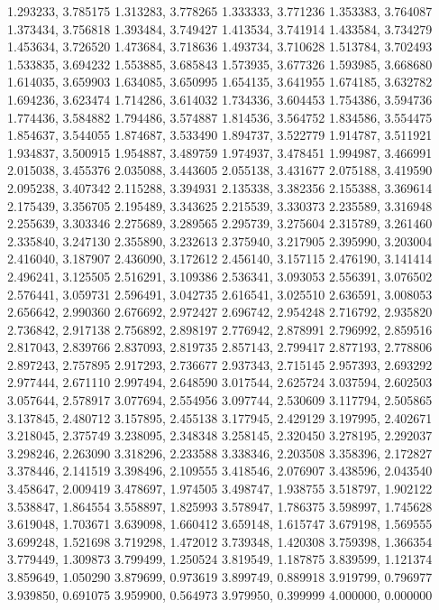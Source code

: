 1.293233, 3.785175
1.313283, 3.778265
1.333333, 3.771236
1.353383, 3.764087
1.373434, 3.756818
1.393484, 3.749427
1.413534, 3.741914
1.433584, 3.734279
1.453634, 3.726520
1.473684, 3.718636
1.493734, 3.710628
1.513784, 3.702493
1.533835, 3.694232
1.553885, 3.685843
1.573935, 3.677326
1.593985, 3.668680
1.614035, 3.659903
1.634085, 3.650995
1.654135, 3.641955
1.674185, 3.632782
1.694236, 3.623474
1.714286, 3.614032
1.734336, 3.604453
1.754386, 3.594736
1.774436, 3.584882
1.794486, 3.574887
1.814536, 3.564752
1.834586, 3.554475
1.854637, 3.544055
1.874687, 3.533490
1.894737, 3.522779
1.914787, 3.511921
1.934837, 3.500915
1.954887, 3.489759
1.974937, 3.478451
1.994987, 3.466991
2.015038, 3.455376
2.035088, 3.443605
2.055138, 3.431677
2.075188, 3.419590
2.095238, 3.407342
2.115288, 3.394931
2.135338, 3.382356
2.155388, 3.369614
2.175439, 3.356705
2.195489, 3.343625
2.215539, 3.330373
2.235589, 3.316948
2.255639, 3.303346
2.275689, 3.289565
2.295739, 3.275604
2.315789, 3.261460
2.335840, 3.247130
2.355890, 3.232613
2.375940, 3.217905
2.395990, 3.203004
2.416040, 3.187907
2.436090, 3.172612
2.456140, 3.157115
2.476190, 3.141414
2.496241, 3.125505
2.516291, 3.109386
2.536341, 3.093053
2.556391, 3.076502
2.576441, 3.059731
2.596491, 3.042735
2.616541, 3.025510
2.636591, 3.008053
2.656642, 2.990360
2.676692, 2.972427
2.696742, 2.954248
2.716792, 2.935820
2.736842, 2.917138
2.756892, 2.898197
2.776942, 2.878991
2.796992, 2.859516
2.817043, 2.839766
2.837093, 2.819735
2.857143, 2.799417
2.877193, 2.778806
2.897243, 2.757895
2.917293, 2.736677
2.937343, 2.715145
2.957393, 2.693292
2.977444, 2.671110
2.997494, 2.648590
3.017544, 2.625724
3.037594, 2.602503
3.057644, 2.578917
3.077694, 2.554956
3.097744, 2.530609
3.117794, 2.505865
3.137845, 2.480712
3.157895, 2.455138
3.177945, 2.429129
3.197995, 2.402671
3.218045, 2.375749
3.238095, 2.348348
3.258145, 2.320450
3.278195, 2.292037
3.298246, 2.263090
3.318296, 2.233588
3.338346, 2.203508
3.358396, 2.172827
3.378446, 2.141519
3.398496, 2.109555
3.418546, 2.076907
3.438596, 2.043540
3.458647, 2.009419
3.478697, 1.974505
3.498747, 1.938755
3.518797, 1.902122
3.538847, 1.864554
3.558897, 1.825993
3.578947, 1.786375
3.598997, 1.745628
3.619048, 1.703671
3.639098, 1.660412
3.659148, 1.615747
3.679198, 1.569555
3.699248, 1.521698
3.719298, 1.472012
3.739348, 1.420308
3.759398, 1.366354
3.779449, 1.309873
3.799499, 1.250524
3.819549, 1.187875
3.839599, 1.121374
3.859649, 1.050290
3.879699, 0.973619
3.899749, 0.889918
3.919799, 0.796977
3.939850, 0.691075
3.959900, 0.564973
3.979950, 0.399999
4.000000, 0.000000
